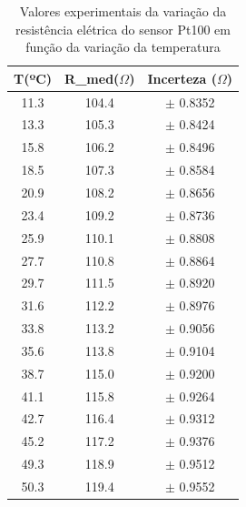 \documentclass[a4paper]{instrumentacao}
\begin{document}
\begin{table}[H]
\centering
\caption{Valores experimentais da variação da resistência elétrica do sensor Pt100 em função da variação da temperatura}
\label{tab:pt100-resistencia-exp}
\begin{tabular}{|c|c|c|}
\hline
\textbf{T(ºC)} & \textbf{R\_med($\Omega$)} & \textbf{Incerteza ($\Omega$)} \\ \hline
11.3           & 104.4                 & $\pm$ 0.8352                    \\ \hline
13.3           & 105.3                 & $\pm$ 0.8424                    \\ \hline
15.8           & 106.2                 & $\pm$ 0.8496                    \\ \hline
18.5           & 107.3                 & $\pm$ 0.8584                    \\ \hline
20.9           & 108.2                 & $\pm$ 0.8656                    \\ \hline
23.4           & 109.2                 & $\pm$ 0.8736                    \\ \hline
25.9           & 110.1                 & $\pm$ 0.8808                    \\ \hline
27.7           & 110.8                 & $\pm$ 0.8864                    \\ \hline
29.7           & 111.5                 & $\pm$ 0.8920                    \\ \hline
31.6           & 112.2                 & $\pm$ 0.8976                    \\ \hline
33.8           & 113.2                 & $\pm$ 0.9056                    \\ \hline
35.6           & 113.8                 & $\pm$ 0.9104                    \\ \hline
38.7           & 115.0                 & $\pm$ 0.9200                    \\ \hline
41.1           & 115.8                 & $\pm$ 0.9264                    \\ \hline
42.7           & 116.4                 & $\pm$ 0.9312                    \\ \hline
45.2           & 117.2                 & $\pm$ 0.9376                    \\ \hline
49.3           & 118.9                 & $\pm$ 0.9512                    \\ \hline
50.3           & 119.4                 & $\pm$ 0.9552                    \\ \hline
\end{tabular}
\end{table}
\end{document}
